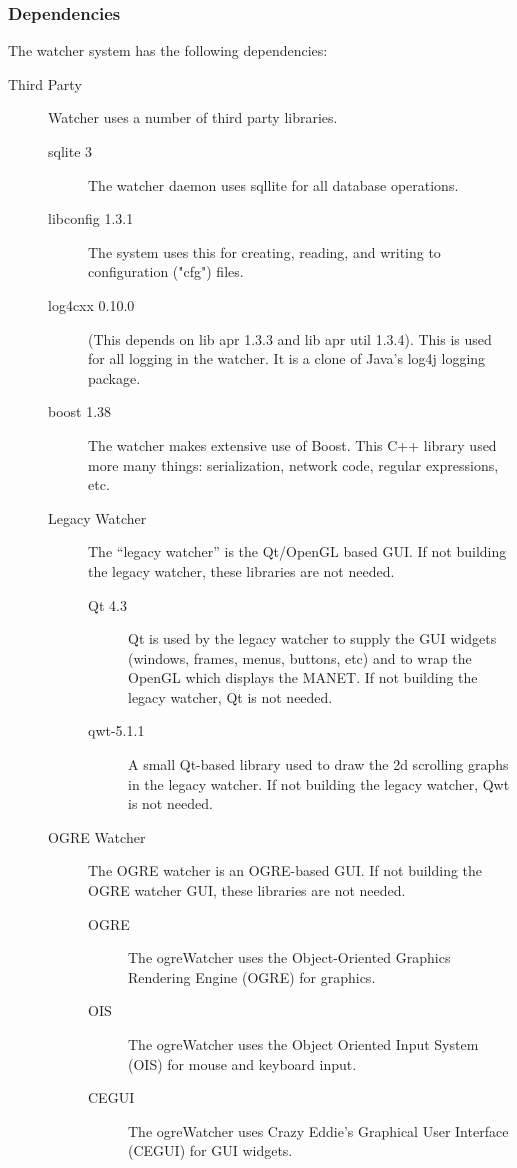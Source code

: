 \documentclass{article}
\begin{document}
\subsubsection{Dependencies}
The watcher system has the following dependencies:
\begin{description}
\item[Third Party] Watcher uses a number of third party libraries. 
\begin{description}
\item[sqlite 3] The watcher daemon uses sqllite for all database operations. 
\item[libconfig 1.3.1] The system uses this for creating, reading, and writing to configuration ("cfg") files. 
\item[log4cxx 0.10.0] (This depends on lib apr 1.3.3 and lib apr util 1.3.4). This is used for all logging in the watcher.  It is a clone of Java's log4j logging package. 
\item[boost 1.38] The watcher makes extensive use of Boost. This C++ library used more many things: serialization, network code, regular expressions, etc. 
\item[Legacy Watcher] The ``legacy watcher'' is the Qt\slash OpenGL based GUI. If not building the legacy watcher, these libraries are not needed. 
\begin{description}
\item[Qt 4.3] Qt is used by the legacy watcher to supply the GUI widgets (windows, frames, menus, buttons, etc) and to wrap the OpenGL which displays the MANET. If not building the legacy watcher, 
    Qt is not needed. 
\item[qwt-5.1.1] A small Qt-based library used to draw the 2d scrolling graphs in the legacy watcher. If not building the legacy watcher, Qwt is not needed.
\end{description}
\item[OGRE Watcher] The OGRE watcher is an OGRE-based GUI. If not building the OGRE watcher GUI, these libraries are not needed. 
\begin{description}
\item[OGRE] The ogreWatcher uses the Object-Oriented Graphics Rendering Engine (OGRE) for graphics. 
\item[OIS] The ogreWatcher uses the Object Oriented Input System (OIS) for mouse and keyboard input. 
\item[CEGUI] The ogreWatcher uses Crazy Eddie's Graphical User Interface (CEGUI) for GUI widgets. 
\end{description}

\end{description}
\end{description}
\end{document}
